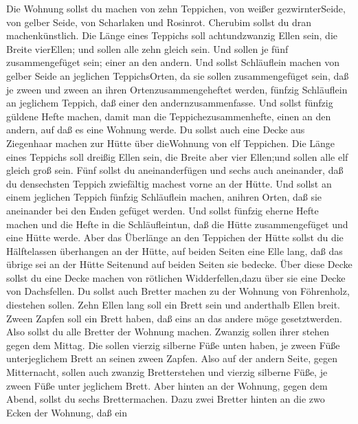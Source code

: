  Die Wohnung sollst du machen von zehn Teppichen, von weißer
gezwirnterSeide, von gelber Seide, von Scharlaken und Rosinrot. Cherubim
sollst du dran machenkünstlich.  Die Länge eines Teppichs
soll achtundzwanzig Ellen sein, die Breite vierEllen; und sollen alle
zehn gleich sein.  Und sollen je fünf zusammengefüget sein;
einer an den andern.  Und sollst Schläuflein machen von
gelber Seide an jeglichen TeppichsOrten, da sie sollen zusammengefüget
sein, daß je zween und zween an ihren Ortenzusammengeheftet werden,
 fünfzig Schläuflein an jeglichem Teppich, daß einer den
andernzusammenfasse.  Und sollst fünfzig güldene Hefte
machen, damit man die Teppichezusammenhefte, einen an den andern, auf
daß es eine Wohnung werde.  Du sollst auch eine Decke aus
Ziegenhaar machen zur Hütte über dieWohnung von elf Teppichen.
 Die Länge eines Teppichs soll dreißig Ellen sein, die
Breite aber vier Ellen;und sollen alle elf gleich groß sein.
 Fünf sollst du aneinanderfügen und sechs auch aneinander,
daß du densechsten Teppich zwiefältig machest vorne an der Hütte.
 Und sollst an einem jeglichen Teppich fünfzig Schläuflein
machen, anihren Orten, daß sie aneinander bei den Enden gefüget werden.
 Und sollst fünfzig eherne Hefte machen und die Hefte in
die Schläufleintun, daß die Hütte zusammengefüget und eine Hütte werde.
 Aber das Überlänge an den Teppichen der Hütte sollst du
die Hälftelassen überhangen an der Hütte,  auf beiden
Seiten eine Elle lang, daß das übrige sei an der Hütte Seitenund auf
beiden Seiten sie bedecke.  Über diese Decke sollst du eine
Decke machen von rötlichen Widderfellen,dazu über sie eine Decke von
Dachsfellen.  Du sollst auch Bretter machen zu der Wohnung
von Föhrenholz, diestehen sollen.  Zehn Ellen lang soll ein
Brett sein und anderthalb Ellen breit.  Zween Zapfen soll
ein Brett haben, daß eins an das andere möge gesetztwerden. Also sollst
du alle Bretter der Wohnung machen.  Zwanzig sollen ihrer
stehen gegen dem Mittag.  Die sollen vierzig silberne Füße
unten haben, je zween Füße unterjeglichem Brett an seinen zween Zapfen.
 Also auf der andern Seite, gegen Mitternacht, sollen auch
zwanzig Bretterstehen  und vierzig silberne Füße, je zween
Füße unter jeglichem Brett.  Aber hinten an der Wohnung,
gegen dem Abend, sollst du sechs Brettermachen.  Dazu zwei
Bretter hinten an die zwo Ecken der Wohnung,  daß ein
